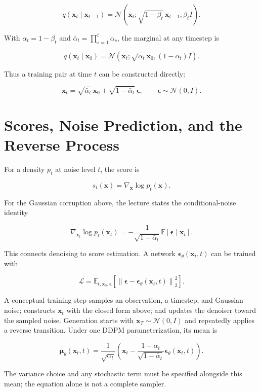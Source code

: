 \documentclass{article}
\begin{document}
\[
q(\mathbf{x}_t\mid\mathbf{x}_{t-1})
=\mathcal{N}\!\left(
\mathbf{x}_t;
\sqrt{1-\beta_t}\,\mathbf{x}_{t-1},
\beta_t I
\right).
\]

With $\alpha_t=1-\beta_t$ and
$\bar\alpha_t=\prod_{s=1}^{t}\alpha_s$, the marginal at any timestep is

\[
q(\mathbf{x}_t\mid\mathbf{x}_0)
=\mathcal{N}\!\left(
\mathbf{x}_t;
\sqrt{\bar\alpha_t}\,\mathbf{x}_0,
(1-\bar\alpha_t)I
\right).
\]

Thus a training pair at time $t$ can be constructed directly:

\[
\mathbf{x}_t
=\sqrt{\bar\alpha_t}\,\mathbf{x}_0
+\sqrt{1-\bar\alpha_t}\,\boldsymbol{\epsilon},
\qquad
\boldsymbol{\epsilon}\sim\mathcal{N}(0,I).
\]

\section{Scores, Noise Prediction, and the Reverse Process}

For a density $p_t$ at noise level $t$, the score is

\[
s_t(\mathbf{x})=\nabla_{\mathbf{x}}\log p_t(\mathbf{x}).
\]

For the Gaussian corruption above, the lecture states the conditional-noise identity

\[
\nabla_{\mathbf{x}_t}\log p_t(\mathbf{x}_t)
=-\frac{1}{\sqrt{1-\bar\alpha_t}}
\mathbb{E}[\boldsymbol{\epsilon}\mid\mathbf{x}_t].
\]

This connects denoising to score estimation. A network
$\boldsymbol{\epsilon}_{\theta}(\mathbf{x}_t,t)$ can be trained with

\[
\mathcal{L}
=\mathbb{E}_{t,\mathbf{x}_0,\boldsymbol{\epsilon}}
\left[
\left\|
\boldsymbol{\epsilon}
-\boldsymbol{\epsilon}_{\theta}(\mathbf{x}_t,t)
\right\|_2^2
\right].
\]

A conceptual training step samples an observation, a timestep, and Gaussian noise;
constructs $\mathbf{x}_t$ with the closed form above; and updates the denoiser toward
the sampled noise. Generation starts with
$\mathbf{x}_T\sim\mathcal{N}(0,I)$ and repeatedly applies a reverse transition. Under
one DDPM parameterization, its mean is

\[
\boldsymbol{\mu}_{\theta}(\mathbf{x}_t,t)
=\frac{1}{\sqrt{\alpha_t}}
\left(
\mathbf{x}_t
-\frac{1-\alpha_t}{\sqrt{1-\bar\alpha_t}}
\boldsymbol{\epsilon}_{\theta}(\mathbf{x}_t,t)
\right).
\]

The variance choice and any stochastic term must be specified alongside this mean;
the equation alone is not a complete sampler.
\end{document}
